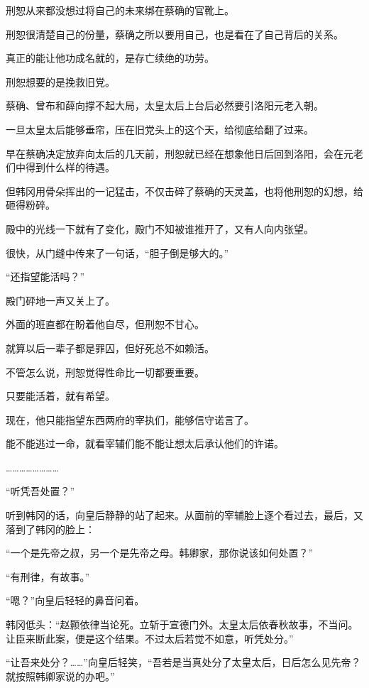 刑恕从来都没想过将自己的未来绑在蔡确的官靴上。

刑恕很清楚自己的份量，蔡确之所以要用自己，也是看在了自己背后的关系。

真正的能让他功成名就的，是存亡续绝的功劳。

刑恕想要的是挽救旧党。

蔡确、曾布和薛向撑不起大局，太皇太后上台后必然要引洛阳元老入朝。

一旦太皇太后能够垂帘，压在旧党头上的这个天，给彻底给翻了过来。

早在蔡确决定放弃向太后的几天前，刑恕就已经在想象他日后回到洛阳，会在元老们中得到什么样的待遇。

但韩冈用骨朵挥出的一记猛击，不仅击碎了蔡确的天灵盖，也将他刑恕的幻想，给砸得粉碎。

殿中的光线一下就有了变化，殿门不知被谁推开了，又有人向内张望。

很快，从门缝中传来了一句话，“胆子倒是够大的。”

“还指望能活吗？”

殿门砰地一声又关上了。

外面的班直都在盼着他自尽，但刑恕不甘心。

就算以后一辈子都是罪囚，但好死总不如赖活。

不管怎么说，刑恕觉得性命比一切都要重要。

只要能活着，就有希望。

现在，他只能指望东西两府的宰执们，能够信守诺言了。

能不能逃过一命，就看宰辅们能不能让想太后承认他们的许诺。

……………………

“听凭吾处置？”

听到韩冈的话，向皇后静静的站了起来。从面前的宰辅脸上逐个看过去，最后，又落到了韩冈的脸上：

“一个是先帝之叔，另一个是先帝之母。韩卿家，那你说该如何处置？”

“有刑律，有故事。”

“嗯？”向皇后轻轻的鼻音问着。

韩冈低头：“赵颢依律当论死。立斩于宣德门外。太皇太后依春秋故事，不当问。让臣来断此案，便是这个结果。不过太后若觉不如意，听凭处分。”

“让吾来处分？……”向皇后轻笑，“吾若是当真处分了太皇太后，日后怎么见先帝？就按照韩卿家说的办吧。”

